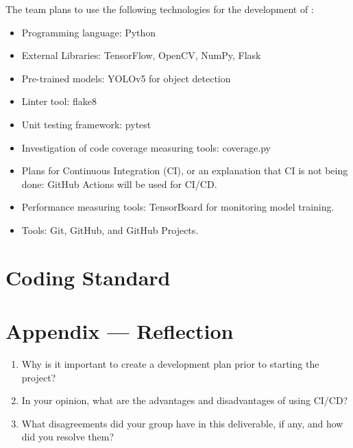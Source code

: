 \documentclass{article}
\begin{document}
The team plans to use the following technologies for the development of \progname{}:
\begin{itemize}
\item Programming language: Python
\item External Libraries: TensorFlow, OpenCV, NumPy, Flask
\item Pre-trained models: YOLOv5 for object detection
\item Linter tool: flake8
\item Unit testing framework: pytest
\item Investigation of code coverage measuring tools: coverage.py
\item Plans for Continuous Integration (CI), or an explanation that CI
  is not being done: GitHub Actions will be used for CI/CD.
\item Performance measuring tools: TensorBoard for monitoring model training.
\item Tools: Git, GitHub, and GitHub Projects.
\end{itemize}


\section{Coding Standard}


\newpage{}

\section*{Appendix --- Reflection}




\begin{enumerate}
    \item Why is it important to create a development plan prior to starting the
    project?
    \item In your opinion, what are the advantages and disadvantages of using
    CI/CD?
    \item What disagreements did your group have in this deliverable, if any,
    and how did you resolve them?
\end{enumerate}

\newpage{}
\end{document}
